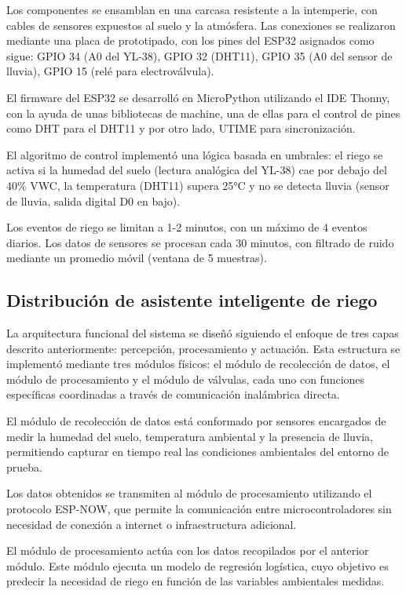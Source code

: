 \documentclass[pdflatex,sn-mathphys-num]{sn-jnl}%
\theoremstyle{thmstyleone}%
\theoremstyle{thmstyletwo}%
\theoremstyle{thmstylethree}%
\begin{document}
\begin{multicols}{2}
Los componentes se ensamblan en una carcasa resistente a la intemperie, con cables de sensores expuestos al suelo y la atmósfera. Las conexiones se realizaron mediante una placa de prototipado, con los pines del ESP32 asignados como sigue: GPIO 34 (A0 del YL-38), GPIO 32 (DHT11), GPIO 35 (A0 del sensor de lluvia), GPIO 15 (relé para electroválvula).

El firmware del ESP32 se desarrolló en MicroPython utilizando el IDE Thonny, con la ayuda de unas bibliotecas de machine, una de ellas para el control de pines como DHT para el DHT11\cite{ref13} y por otro lado, UTIME\cite{ref14} para sincronización. 

El algoritmo de control implementó una lógica basada en umbrales: el riego se activa si la humedad del suelo (lectura analógica del YL-38) cae por debajo del 40\% VWC, la temperatura (DHT11) supera 25°C y no se detecta lluvia (sensor de lluvia, salida digital D0 en bajo). 

Los eventos de riego se limitan a 1-2 minutos, con un máximo de 4 eventos diarios. Los datos de sensores se procesan cada 30 minutos, con filtrado de ruido mediante un promedio móvil (ventana de 5 muestras).

\subsection*{Distribución de asistente inteligente de riego}
La arquitectura funcional del sistema se diseñó siguiendo el enfoque de tres capas descrito anteriormente: percepción, procesamiento y actuación. Esta estructura se implementó mediante tres módulos físicos: el módulo de recolección de datos, el módulo de procesamiento y el módulo de válvulas, cada uno con funciones específicas coordinadas a través de comunicación inalámbrica directa.

El módulo de recolección de datos está conformado por sensores encargados de medir la humedad del suelo, temperatura ambiental y la presencia de lluvia, permitiendo capturar en tiempo real las condiciones ambientales del entorno de prueba.

Los datos obtenidos se transmiten al módulo de procesamiento utilizando el protocolo ESP-NOW, que permite la comunicación entre microcontroladores sin necesidad de conexión a internet o infraestructura adicional.

El módulo de procesamiento actúa con los datos recopilados por el anterior módulo. Este módulo ejecuta un modelo de regresión logística, cuyo objetivo es predecir la necesidad de riego en función de las variables ambientales medidas. 


\end{multicols}
\end{document}
